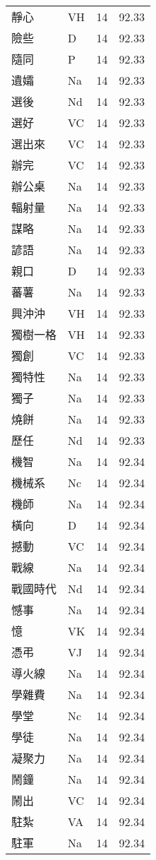 \documentclass[twocolumn]{book}
\begin{document}
\begin{supertabular}{llrr}
靜心 & VH & 14 &  92.33\\
險些 & D & 14 &  92.33\\
隨同 & P & 14 &  92.33\\
遺孀 & Na & 14 &  92.33\\
選後 & Nd & 14 &  92.33\\
選好 & VC & 14 &  92.33\\
選出來 & VC & 14 &  92.33\\
辦完 & VC & 14 &  92.33\\
辦公桌 & Na & 14 &  92.33\\
輻射量 & Na & 14 &  92.33\\
謀略 & Na & 14 &  92.33\\
諺語 & Na & 14 &  92.33\\
親口 & D & 14 &  92.33\\
蕃薯 & Na & 14 &  92.33\\
興沖沖 & VH & 14 &  92.33\\
獨樹一格 & VH & 14 &  92.33\\
獨創 & VC & 14 &  92.33\\
獨特性 & Na & 14 &  92.33\\
獨子 & Na & 14 &  92.33\\
燒餅 & Na & 14 &  92.33\\
歷任 & Nd & 14 &  92.33\\
機智 & Na & 14 &  92.34\\
機械系 & Nc & 14 &  92.34\\
機師 & Na & 14 &  92.34\\
橫向 & D & 14 &  92.34\\
撼動 & VC & 14 &  92.34\\
戰線 & Na & 14 &  92.34\\
戰國時代 & Nd & 14 &  92.34\\
憾事 & Na & 14 &  92.34\\
憶 & VK & 14 &  92.34\\
憑弔 & VJ & 14 &  92.34\\
導火線 & Na & 14 &  92.34\\
學雜費 & Na & 14 &  92.34\\
學堂 & Nc & 14 &  92.34\\
學徒 & Na & 14 &  92.34\\
凝聚力 & Na & 14 &  92.34\\
鬧鐘 & Na & 14 &  92.34\\
鬧出 & VC & 14 &  92.34\\
駐紮 & VA & 14 &  92.34\\
駐軍 & Na & 14 &  92.34\\

\end{supertabular}
\end{document}
